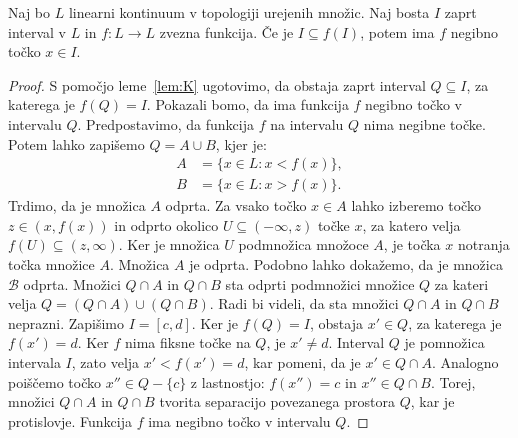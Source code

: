 \documentclass[../TG_magistrsko_delo_sections.tex]{subfiles}
\begin{document}
\begin{lema}
Naj bo $L$ linearni kontinuum v topologiji urejenih množic. Naj bosta $I$ zaprt interval v $L$ in $f:L \to L$ zvezna funkcija. Če je $I \subseteq f(I)$, potem ima $f$ negibno točko $x \in I$.
\end{lema}
\begin{proof}
S pomočjo leme~\ref{lem:K} ugotovimo, da obstaja zaprt interval $Q \subseteq I$, za katerega je $f(Q) = I$. Pokazali bomo, da ima funkcija $f$ negibno točko v intervalu $Q$. Predpostavimo, da funkcija $f$ na intervalu $Q$ nima negibne točke. Potem lahko zapišemo $Q = A \cup B$, kjer je:
\begin{equation*} %
\begin{split}
A &= \{x \in L : x < f(x)\}, \\ 
B &= \{x \in L : x > f(x)\}.
\end{split}
\end{equation*}
Trdimo, da je množica $A$ odprta. Za vsako točko $x \in A$ lahko izberemo točko $z \in (x, f(x))$ in odprto okolico $U \subseteq  (-\infty, z)$ točke $x$, za katero velja $f(U) \subseteq (z, \infty)$. Ker je množica $U$ podmnožica množoce $A$, je točka $x$ notranja točka množice $A$. Množica $A$ je odprta. Podobno lahko dokažemo, da je množica $\mathcal{B}$ odprta. Množici $Q \cap A$ in $Q \cap B$ sta odprti podmnožici množice $Q$ za kateri velja $Q = (Q \cap A) \cup (Q \cap B)$. Radi bi videli, da sta množici $Q \cap A$ in $Q \cap B$ neprazni. Zapišimo $I = [c, d]$. Ker je $f(Q) = I$, obstaja $x' \in Q$, za katerega je $f(x') =d$. Ker $f$ nima fiksne točke na $Q$, je $x' \neq d$. Interval $Q$ je pomnožica intervala $I$, zato velja $x' < f(x') = d$, kar pomeni, da je $x' \in Q \cap A$. Analogno poiščemo točko $x'' \in Q - \{c\}$ z lastnostjo: $f(x'') = c$ in $x'' \in Q \cap B$. Torej, množici $Q \cap A$ in $Q \cap B$ tvorita separacijo povezanega prostora $Q$, kar je protislovje. Funkcija $f$ ima negibno točko v intervalu $Q$.
\end{proof}
\end{document}
